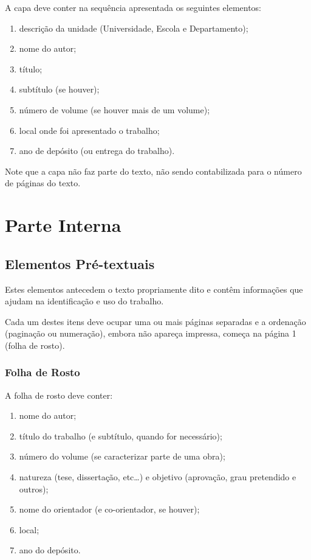 \documentclass[repeatfields,xlists,xpacks,oneside,yearsonly]{ufrgscca}
\begin{document}
A capa deve conter na sequência apresentada os seguintes elementos:

\begin{enumerate}
\item descrição da unidade (Universidade, Escola e Departamento);
\item nome do autor;
\item título;
\item subtítulo (se houver);
\item número de volume (se houver mais de um volume);
\item local onde foi apresentado o trabalho;
\item ano de depósito (ou entrega do trabalho).
\end{enumerate}

Note que a capa não faz parte do texto, não sendo contabilizada para o número de páginas do texto.

\section{Parte Interna}

\subsection{Elementos Pré-textuais}

Estes elementos antecedem o texto propriamente dito e contêm informações que
ajudam na identificação e uso do trabalho.

Cada um destes itens deve ocupar uma ou mais páginas separadas e a ordenação
(paginação ou numeração), embora não apareça impressa, começa na página 1
(folha de rosto).


\subsubsection{Folha de Rosto}

A folha de rosto deve conter:

\begin{enumerate}
\item nome do autor;
\item título do trabalho (e subtítulo, quando for necessário);
\item número do volume (se caracterizar parte de uma obra);
\item natureza (tese, dissertação, etc\ldots) e objetivo (aprovação, grau pretendido e outros);
\item nome do orientador (e co-orientador, se houver);
\item local;
\item ano do depósito.
\end{enumerate}
\end{document}
